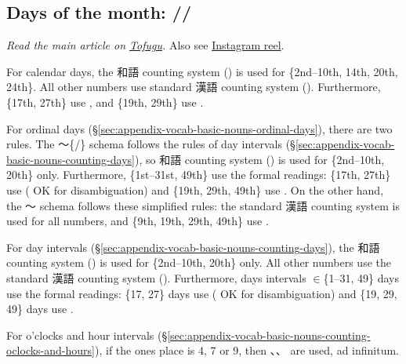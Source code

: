 \documentclass[../nihongo-gakushuu-kyouzai-supplementary.tex]{subfiles}
\begin{document}
\subsection{Days of the month: //} \label{sec:appendix-vocab-basic-nouns-calendar-days}
\emph{Read the main article on \href{https://www.tofugu.com/japanese/japanese-counter-ka-nichi/}{Tofugu}.} Also see \href{https://www.instagram.com/reel/C_4iSZdyIPt/}{Instagram reel}.

\color{orange}
For calendar days, the 和語 counting system () is used for \{2nd--10th, 14th, 20th, 24th\}. All other numbers use standard 漢語 counting system (). Furthermore, \{17th, 27th\} use , and \{19th, 29th\} use .

For ordinal days (\S\ref{sec:appendix-vocab-basic-nouns-ordinal-days}), there are two rules. The 〜\{/\} schema follows the rules of day intervals (\S\ref{sec:appendix-vocab-basic-nouns-counting-days}), so 和語 counting system () is used for \{2nd--10th, 20th\} only. Furthermore, \{1st--31st, 49th\} use the formal readings: \{17th, 27th\} use  ( OK for disambiguation) and \{19th, 29th, 49th\} use . On the other hand, the 〜 schema follows these simplified rules: the standard 漢語 counting system is used for all numbers, and \{9th, 19th, 29th, 49th\} use .

For day intervals (\S\ref{sec:appendix-vocab-basic-nouns-counting-days}), the 和語 counting system () is used for \{2nd--10th, 20th\} only. All other numbers use the standard 漢語 counting system (). Furthermore, days intervals $\in$\{1--31, 49\} days use the formal readings: \{17, 27\} days use  ( OK for disambiguation) and \{19, 29, 49\} days use .

For o'clocks and hour intervals (\S\ref{sec:appendix-vocab-basic-nouns-counting-oclocks-and-hours}), if the ones place is 4, 7 or 9, then 、、 are used, ad infinitum.
\color{black}
\end{document}
